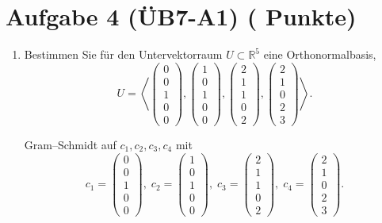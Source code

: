 \documentclass[11pt, a4paper]{article}
\newcommand{\aufgabe}[2]{%
  \section*{\Large\bfseries Aufgabe #1%
  \if\relax\detokenize{#2}\relax\else \hfill\normalfont\normalsize(#2 Punkte)\fi}%
  \vspace{-1.5ex}
}
\begin{document}
\aufgabe{4 (ÜB7-A1)}{}
\begin{enumerate}
  \item Bestimmen Sie für den Untervektorraum $U\subset\mathbb{R}^5$ eine Orthonormalbasis,
  \[
    U=\left\langle
    \begin{pmatrix}0\\0\\1\\0\\0\end{pmatrix},
    \begin{pmatrix}1\\0\\1\\0\\0\end{pmatrix},
    \begin{pmatrix}2\\1\\1\\0\\2\end{pmatrix},
    \begin{pmatrix}2\\1\\0\\2\\3\end{pmatrix}
    \right\rangle .
  \]
  \begin{framed}
  Gram–Schmidt auf $c_1,c_2,c_3,c_4$ mit
  \[
  c_1=\begin{pmatrix}0\\0\\1\\0\\0\end{pmatrix},\;
  c_2=\begin{pmatrix}1\\0\\1\\0\\0\end{pmatrix},\;
  c_3=\begin{pmatrix}2\\1\\1\\0\\2\end{pmatrix},\;
  c_4=\begin{pmatrix}2\\1\\0\\2\\3\end{pmatrix}.
\]
\end{framed}
\end{enumerate}
\end{document}
